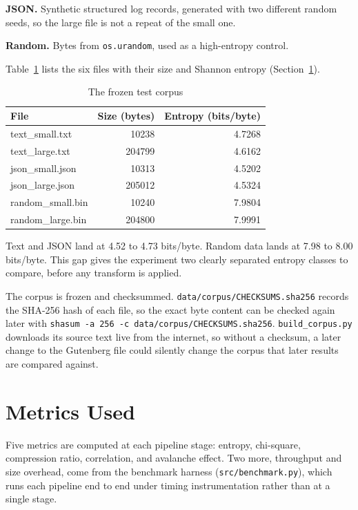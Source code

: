 \documentclass[12pt,a4paper,twoside]{report}
\numberwithin{equation}{chapter}
\begin{document}
\textbf{JSON.} Synthetic structured log records, generated with two
different random seeds, so the large file is not a repeat of the
small one.

\textbf{Random.} Bytes from \texttt{os.urandom}, used as a
high-entropy control.

Table~\ref{tab:corpus} lists the six files with their size and Shannon
entropy (Section~\ref{sec:metrics}).

\begin{table}[h]
\centering
\caption{The frozen test corpus}
\label{tab:corpus}
\begin{tabular}{lrr}
\toprule
File & Size (bytes) & Entropy (bits/byte) \\
\midrule
text\_small.txt & 10238 & 4.7268 \\
text\_large.txt & 204799 & 4.6162 \\
json\_small.json & 10313 & 4.5202 \\
json\_large.json & 205012 & 4.5324 \\
random\_small.bin & 10240 & 7.9804 \\
random\_large.bin & 204800 & 7.9991 \\
\bottomrule
\end{tabular}
\end{table}

Text and JSON land at 4.52 to 4.73 bits/byte. Random data lands at 7.98
to 8.00 bits/byte. This gap gives the experiment two clearly separated
entropy classes to compare, before any transform is applied.

The corpus is frozen and checksummed.
\texttt{data/corpus/CHECKSUMS.sha256} records the SHA-256 hash of each
file, so the exact byte content can be checked again later with
\texttt{shasum -a 256 -c data/corpus/CHECKSUMS.sha256}.
\texttt{build\_corpus.py} downloads its source text live from the
internet, so without a checksum, a later change to the Gutenberg file
could silently change the corpus that later results are compared
against.

\section{Metrics Used}
\label{sec:metrics}
Five metrics are computed at each pipeline stage: entropy, chi-square,
compression ratio, correlation, and avalanche effect. Two more,
throughput and size overhead, come from the benchmark harness
(\texttt{src/benchmark.py}), which runs each pipeline end to end under
timing instrumentation rather than at a single stage.
\end{document}
